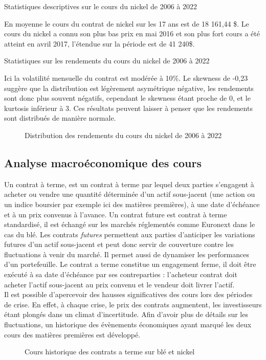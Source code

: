 \begin{table}[H]
    \centering
    \caption{Statistiques descriptives sur le cours du nickel de 2006 à 2022}
    \sffamily
    \resizebox{\textwidth}{!}{}
\end{table}
En moyenne le cours du contrat de nickel sur les 17 ans est de 18 161,44 \$. Le cours du nickel a connu son plus bas prix en mai 2016 et son plus fort cours a été atteint en avril 2017, l'étendue sur la période est de 41 240\$.
\begin{table}[H]
    \centering
    \caption{Statistiques sur les rendements du cours du nickel de 2006 à 2022}
    \sffamily
    \resizebox{\textwidth}{!}{}
\end{table}
Ici la volatilité mensuelle du contrat est modérée à 10\%. Le skewness de -0,23 suggère que la distribution est légèrement asymétrique négative, les rendements sont donc plus souvent négatifs, cependant le skewness étant proche de 0, et le kurtosis inférieur à 3. Ces résultats peuvent laisser à penser que les rendements sont 
distribués de manière normale.
\begin{figure}[H]
    \centering
    \resizebox{\textwidth}{!}{}
    \caption{Distribution des rendements du cours du nickel de 2006 à 2022}
\end{figure}
\subsection{Analyse macroéconomique des cours}
Un contrat à terme, est un contrat à terme par lequel deux parties s'engagent à acheter ou vendre une quantité déterminée d'un actif sous-jacent (une 
action ou un indice boursier par exemple ici des matières premières), à une date d'échéance et à un prix convenus à l'avance. Un contrat future est contrat à terme 
standardisé, il est échangé sur les marchés réglementés comme Euronext dans le cas du blé. Les contrats \textit{futures} permettent aux parties d'anticiper les variations 
futures d'un actif sous-jacent et peut donc servir de couverture contre les fluctuations à venir du marché. Il permet aussi de dynamiser les performances d'un 
portefeuille. Le contrat a terme constitue un engagement ferme, il doit être exécuté à sa date d'échéance par ses contreparties : l'acheteur contrat doit acheter l'actif 
sous-jacent au prix convenu et le vendeur doit livrer l'actif.\\[11pt]
Il est possible d'apercevoir des hausses significatives des cours lors des périodes de crise. En effet, à chaque crise, le prix des contrats augmentent, les investisseurs 
étant plongés dans un climat d'incertitude. Afin d'avoir plus de détails sur les fluctuations, un historique des évènements économiques ayant marqué les deux cours des 
matières premières est développé.
\begin{figure}[H]
    \centering
    \resizebox{\textwidth}{!}{}
    \caption{Cours historique des contrats a terme sur blé et nickel}
\end{figure}

